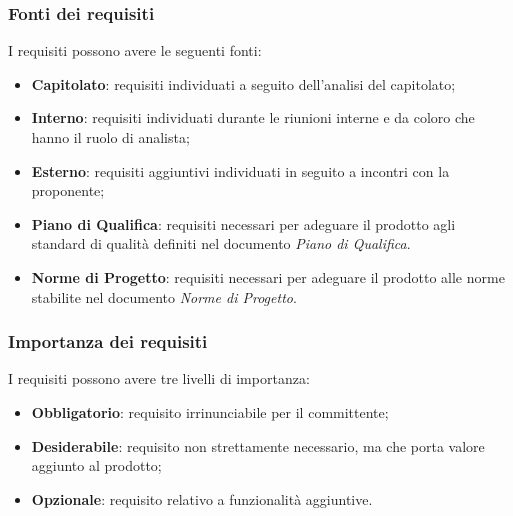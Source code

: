 \subsubsection{Fonti dei requisiti}
\label{sec:fonti_requisiti}
I requisiti possono avere le seguenti fonti:
\begin{itemize}
	\item \textbf{Capitolato}: requisiti individuati a seguito dell'analisi del capitolato;
	\item \textbf{Interno}: requisiti individuati durante le riunioni interne e da coloro che hanno il ruolo di analista;
	\item \textbf{Esterno}: requisiti aggiuntivi individuati in seguito a incontri con la proponente;
	\item \textbf{Piano di Qualifica}: requisiti necessari per adeguare il prodotto agli standard di qualità definiti nel documento \textit{Piano di Qualifica}.
	\item \textbf{Norme di Progetto}: requisiti necessari per adeguare il prodotto alle norme stabilite nel documento \textit{Norme di Progetto}.
\end{itemize}

\subsubsection{Importanza dei requisiti}
\label{sec:importanza_requisiti}
I requisiti possono avere tre livelli di importanza:
\begin{itemize}
	\item \textbf{Obbligatorio}: requisito irrinunciabile per il committente;
	\item \textbf{Desiderabile}: requisito non strettamente necessario, ma che porta valore aggiunto al prodotto;
	\item \textbf{Opzionale}: requisito relativo a funzionalità aggiuntive.
\end{itemize}


